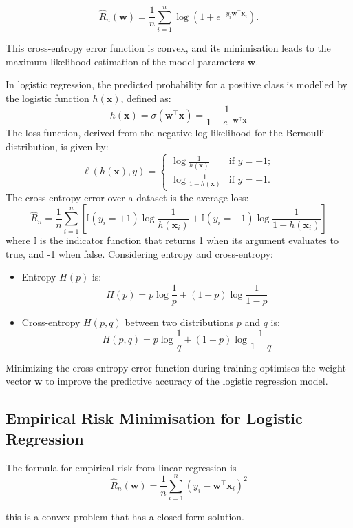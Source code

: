 \[
\hat{R}_n(\mathbf{w}) = \frac{1}{n} \sum_{i=1}^{n} \log \left(1 + e^{-y_i\mathbf{w}^\top\mathbf{x}_i}\right).
\]

This cross-entropy error function is convex, and its minimisation leads to the maximum likelihood estimation of the model parameters \( \mathbf{w} \).

In logistic regression, the predicted probability for a positive class is modelled by the logistic function \( h(\mathbf{x}) \), defined as:
\[ h(\mathbf{x}) = \sigma(\mathbf{w}^\top \mathbf{x}) = \frac{1}{1 + e^{-\mathbf{w}^\top \mathbf{x}}} \]
The loss function, derived from the negative log-likelihood for the Bernoulli distribution, is given by:
\[ \ell(h(\mathbf{x}), y) = \begin{cases}
\log \frac{1}{h(\mathbf{x})} & \text{if } y = +1;\\
\log \frac{1}{1 - h(\mathbf{x})} & \text{if } y = -1.
\end{cases} \]
The cross-entropy error over a dataset is the average loss:
\[ \hat{R}_n = \frac{1}{n} \sum_{i=1}^{n} \left[ \mathbb{I}(y_i = +1) \log \frac{1}{h(\mathbf{x}_i)} + \mathbb{I}(y_i = -1) \log \frac{1}{1 - h(\mathbf{x}_i)} \right] \] where $\mathbb{I}$ is the indicator function that returns 1 when its argument evaluates to true, and -1 when false.
Considering entropy and cross-entropy:
\begin{itemize}
\item Entropy \( H(p) \) is:
\[ H(p) = p \log \frac{1}{p} + (1 - p) \log \frac{1}{1 - p} \]
\item Cross-entropy \( H(p, q) \) between two distributions \( p \) and \( q \) is:
\[ H(p, q) = p \log \frac{1}{q} + (1 - p) \log \frac{1}{1 - q} \]
\end{itemize}
Minimizing the cross-entropy error function during training optimises the weight vector \( \mathbf{w} \) to improve the predictive accuracy of the logistic regression model.


\subsection{Empirical Risk Minimisation for Logistic Regression}

The formula for empirical risk from linear regression is \[
\widehat R_n(\mathbf{w})=\frac1n\sum_{i=1}^n(y_i-\mathbf{w}^\top\mathbf{x}_i)^2
\] 

this is a convex problem that has a closed-form solution.\\

